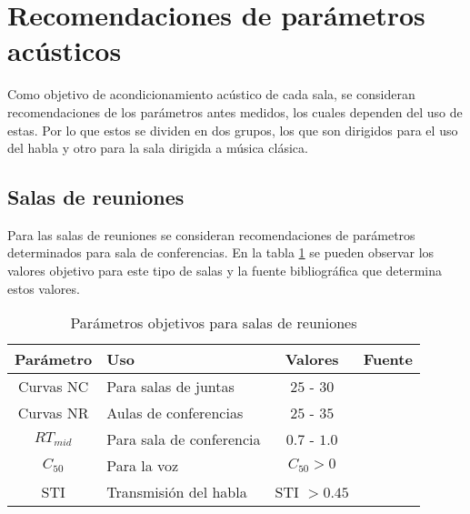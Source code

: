 \section{Recomendaciones de parámetros acústicos} \label{secc: Recomendaciones}
Como objetivo de acondicionamiento acústico de cada sala, se consideran recomendaciones de los parámetros antes medidos, los cuales dependen del uso de estas. Por lo que estos se dividen en dos grupos, los que son dirigidos para el uso del habla y otro para la sala dirigida a música clásica.
\subsection{Salas de reuniones}
Para las salas de reuniones se consideran recomendaciones de parámetros determinados para sala de conferencias. En la tabla \ref{tab: parametros objetivos sala de reuniones} se pueden observar los valores objetivo para este tipo de salas y la fuente bibliográfica que determina estos valores.
\begin{table}[H]
    \centering
    \begin{tabular}{|c|l|c|c|}
    \hline
    \textbf{Parámetro} & \textbf{Uso }                 & \textbf{Valores}     & \textbf{Fuente}  \\ \hline
    Curvas NC & Para salas de juntas & $25$ - $30$ & \cite{Recuero} \\ \hline
    Curvas NR & Aulas de conferencias& $25$ - $35$ & \cite{Recuero} \\ \hline
    $RT_{mid}$ & Para sala de conferencia & $0.7$ - $1.0$ & \cite{carrion1990diseno}\\ \hline
    $C_{50}$  & Para la voz &  $C_{50}>0$         &  \cite{marshall1994}  \\ \hline  
    STI & Transmisión del habla & STI $>0.45$ & \cite{ISO9921}\\ \hline
    \end{tabular}
    \caption{Parámetros objetivos para salas de reuniones}
    \label{tab: parametros objetivos sala de reuniones}
\end{table}
